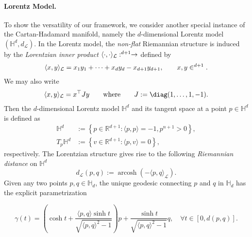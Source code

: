 \documentclass[twoside,11pt]{article}
\begin{document}
\paragraph{Lorentz Model.} To show the versatility of our framework, we consider another special instance of the Cartan-Hadamard manifold, namely the $d$-dimensional Lorentz model $(\mathbb{H}^d, d_\mathcal{L})$. In the Lorentz model, the \emph{non-flat} Riemannian structure is induced by the \textit{Lorentzian inner product} $\langle \cdot, \cdot \rangle_\mathcal{L}: \real^{d+1} \to \real$ defined by 
\[
\langle x, y \rangle_\mathcal{L} = x_1 y_1 + \cdots + x_d y_d - x_{d+1}y_{d+1}, \qquad x,y \in \real^{d+1}.
\]
We may also write 
\[
\langle x, y \rangle_\mathcal{L} = x^\top J y \qquad \text{where} \qquad J := \diag(1, \ldots, 1, -1).
\]
Then the $d$-dimensional Lorentz model $\mathbb{H}^d$ and its tangent space at a point $p \in \mathbb{H}^d$ is defined as 
\[
\begin{aligned}
\mathbb{H}^d & :=\left\{p \in \mathbb{R}^{d+1}:\langle p, p\rangle=-1, p^{n+1}>0\right\}, \\
T_p \mathbb{H}^d & :=\left\{v \in \mathbb{R}^{d+1}:\langle p, v\rangle=0\right\},
\end{aligned}
\]
respectively. The Lorentzian structure gives rise to the following \textit{Riemannian distance} on $\mathbb{H}^d$ 
\[
d_\mathcal{L}(p,q) := \operatorname{arcosh}(-\langle p, q \rangle_\mathcal{L}). 
\]
 Given any two points $p,q \in \mathbb{H}_d$, the unique geodesic connecting $p$ and $q$ in $\mathbb{H}_d$ has the explicit parametrization 

\[
\gamma(t)=\left(\cosh t+\frac{\langle p, q\rangle \sinh t}{\sqrt{\langle p, q\rangle^2-1}}\right) p+\frac{\sinh t}{\sqrt{\langle p, q\rangle^2-1}} q, \quad \forall t \in[0, d(p, q)].
\]
\end{document}
